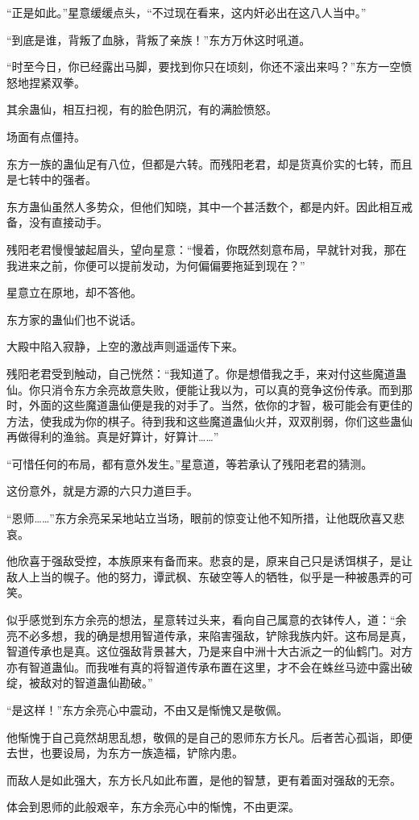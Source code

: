 \begin{this_body}
“正是如此。”星意缓缓点头，“不过现在看来，这内奸必出在这八人当中。”

“到底是谁，背叛了血脉，背叛了亲族！”东方万休这时吼道。

“时至今日，你已经露出马脚，要找到你只在顷刻，你还不滚出来吗？”东方一空愤怒地捏紧双拳。

其余蛊仙，相互扫视，有的脸色阴沉，有的满脸愤怒。

场面有点僵持。

东方一族的蛊仙足有八位，但都是六转。而残阳老君，却是货真价实的七转，而且是七转中的强者。

东方蛊仙虽然人多势众，但他们知晓，其中一个甚活数个，都是内奸。因此相互戒备，没有直接动手。

残阳老君慢慢皱起眉头，望向星意：“慢着，你既然刻意布局，早就针对我，那在我进来之前，你便可以提前发动，为何偏偏要拖延到现在？”

星意立在原地，却不答他。

东方家的蛊仙们也不说话。

大殿中陷入寂静，上空的激战声则遥遥传下来。

残阳老君受到触动，自己恍然：“我知道了。你是想借我之手，来对付这些魔道蛊仙。你只消令东方余亮故意失败，便能让我以为，可以真的竞争这份传承。而到那时，外面的这些魔道蛊仙便是我的对手了。当然，依你的才智，极可能会有更佳的方法，使我成为你的棋子。待到我和这些魔道蛊仙火并，双双削弱，你们这些蛊仙再做得利的渔翁。真是好算计，好算计……”

“可惜任何的布局，都有意外发生。”星意道，等若承认了残阳老君的猜测。

这份意外，就是方源的六只力道巨手。

“恩师……”东方余亮呆呆地站立当场，眼前的惊变让他不知所措，让他既欣喜又悲哀。

他欣喜于强敌受控，本族原来有备而来。悲哀的是，原来自己只是诱饵棋子，是让敌人上当的幌子。他的努力，谭武枫、东破空等人的牺牲，似乎是一种被愚弄的可笑。

似乎感觉到东方余亮的想法，星意转过头来，看向自己属意的衣钵传人，道：“余亮不必多想，我的确是想用智道传承，来陷害强敌，铲除我族内奸。这布局是真，智道传承也是真。这位强敌背景甚大，乃是来自中洲十大古派之一的仙鹤门。对方亦有智道蛊仙。而我唯有真的将智道传承布置在这里，才不会在蛛丝马迹中露出破绽，被敌对的智道蛊仙勘破。”

“是这样！”东方余亮心中震动，不由又是惭愧又是敬佩。

他惭愧于自己竟然胡思乱想，敬佩的是自己的恩师东方长凡。后者苦心孤诣，即便去世，也要设局，为东方一族造福，铲除内患。

而敌人是如此强大，东方长凡如此布置，是他的智慧，更有着面对强敌的无奈。

体会到恩师的此般艰辛，东方余亮心中的惭愧，不由更深。

\end{this_body}

